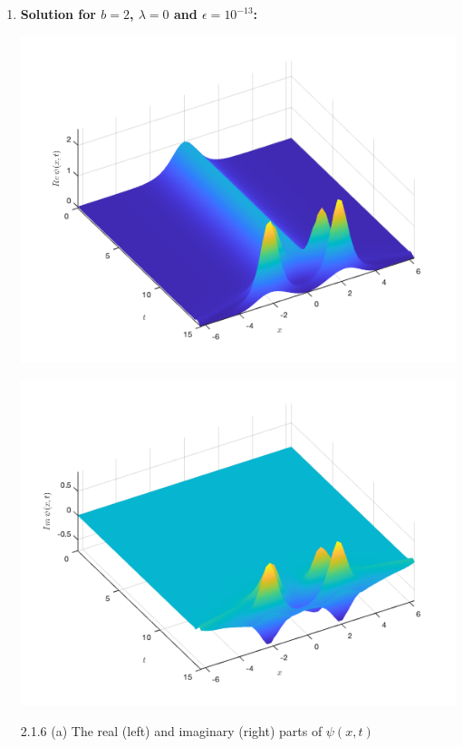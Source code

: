 \documentclass[12pt, letterpaper, twoside]{article}
\begin{document}
\begin{enumerate}[label=(\roman*)]
\item \textbf{Solution for $b = 2$, $\lambda=0$ and $\epsilon = 10^{-13}$:}
\begin{multicols}{2}
\begin{center}
    \includegraphics[scale=0.35]{Figures/(b2real).png}
\end{center}
\begin{center}
    \includegraphics[scale=0.35]{Figures/(b2imag).png}
\end{center}
\end{multicols}
\figurename{ 2.1.6 (a) The real (left) and imaginary (right) parts of $\psi(x, t)$}


\end{enumerate}
\end{document}
